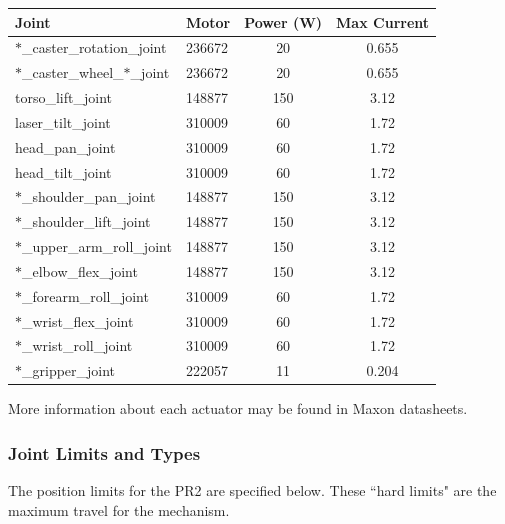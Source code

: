 \begin{tabular}{ll*{2}{c}}
Joint  & Motor & Power (W) & Max Current \\
\hline \hline
$\ast$\_caster\_rotation\_joint       & 236672 & 20  & 0.655 \\
$\ast$\_caster\_wheel\_$\ast$\_joint  & 236672 & 20  & 0.655 \\
torso\_lift\_joint                    & 148877 & 150 & 3.12  \\
laser\_tilt\_joint                    & 310009 & 60  & 1.72  \\
head\_pan\_joint                      & 310009 & 60  & 1.72  \\
head\_tilt\_joint                     & 310009 & 60  & 1.72  \\
$\ast$\_shoulder\_pan\_joint          & 148877 & 150 & 3.12  \\
$\ast$\_shoulder\_lift\_joint         & 148877 & 150 & 3.12  \\
$\ast$\_upper\_arm\_roll\_joint       & 148877 & 150 & 3.12  \\
$\ast$\_elbow\_flex\_joint            & 148877 & 150 & 3.12  \\
$\ast$\_forearm\_roll\_joint          & 310009 & 60  & 1.72  \\
$\ast$\_wrist\_flex\_joint            & 310009 & 60  & 1.72  \\
$\ast$\_wrist\_roll\_joint            & 310009 & 60  & 1.72  \\
$\ast$\_gripper\_joint                & 222057 & 11  & 0.204 \\
\end{tabular}

More information about each actuator may be found in Maxon datasheets.

\subsubsection{Joint Limits and Types}

The position limits for the PR2 are specified below. These ``hard limits" are the maximum travel for the mechanism. 

